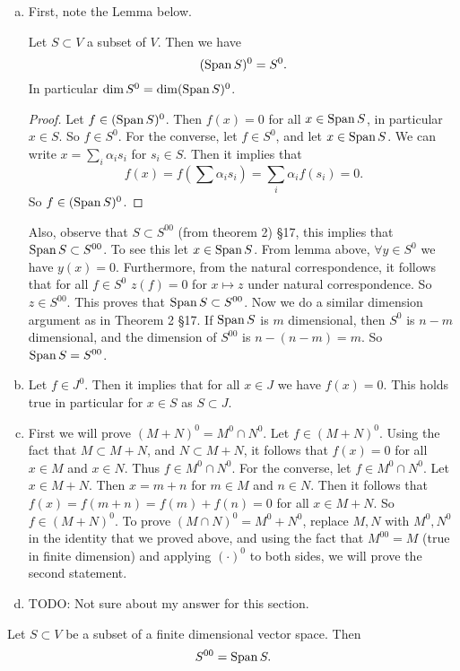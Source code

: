 \begin{problem}
	\begin{solution}
		\begin{enumerate}[(a)]
			\item First, note the Lemma below.
			\begin{lemma}
				Let $ S \subset V $ a subset of $ V $. Then we have
				\[ (\operatorname{Span} S)^0 = S^0. \]
				In particular $ \dim S^0  = \dim (\operatorname{Span} S)^0$.
			\end{lemma}
			\begin{proof}
				Let $ f\in (\operatorname{Span} S)^0 $. Then $ f(x) = 0 $ for all $ x\in \operatorname{Span} S $, in particular $ x\in S $. So $ f\in S^0 $. For the converse, let $ f \in S^0 $, and let $ x \in \operatorname{Span} S $. We can write $ x = \sum_i \alpha_i s_i $ for $ s_i \in S $. Then it implies that 
				\[ f(x) = f(\sum \alpha_i s_i) = \sum_i \alpha_i f(s_i) = 0.   \]
				So $ f\in (\operatorname{Span} S)^0 $.
			\end{proof}
			Also, observe that $ S \subset S^{00} $ (from theorem 2) \S17, this implies that $ \operatorname{Span} S \subset S^{00} $. To see this let $ x \in \operatorname{Span} S $. From lemma above, $ \forall y \in S^0 $ we have $ y(x) = 0 $. Furthermore, from the natural correspondence, it follows that for all $ f\in S^0 $ $ z(f) = 0 $ for $ x\mapsto z $ under natural correspondence. So $ z\in S^{00} $. This proves that $ \operatorname{Span} S \subset S^{00} $. Now we do a similar dimension argument as in Theorem 2 \S17. If $ \operatorname{Span} S $ is $ m $ dimensional, then $ S^0 $ is $ n-m $ dimensional, and the dimension of $ S^{00} $ is $ n-(n-m) = m $. So $ \operatorname{Span} S = S^{00} $.
			
			\item Let $ f \in  J^0$. Then it implies that for all $ x\in J $ we have $ f(x) = 0 $. This holds true in particular for $ x\in S $ as $ S\subset J $. 
			
			
			\item First we will prove $ (M+N)^0 = M^0 \cap N^0 $. Let $ f\in (M+N)^0 $. Using the fact that $ M\subset M+N $, and $ N\subset M+N $, it follows that $ f(x) = 0 $ for all $ x\in M $ and $ x\in N $. Thus $ f\in M^0\cap N^0 $. For the converse, let $ f\in M^0\cap N^0 $. Let $ x\in M+N $. Then $ x=m+n $ for $ m\in M $ and $ n\in N $. Then it follows that $ f(x) = f(m+n) = f(m) + f(n) = 0 $ for all $ x\in M+N $. So $ f\in (M+N)^0 $. To prove $ (M\cap N)^0 = M^0 + N^0 $, replace $ M,N $ with $ M^0,N^0 $ in the identity that we proved above, and using the fact that $ M^{00} = M $ (true in finite dimension) and applying $ (\cdot)^0 $ to both sides, we will prove the second statement.
			
			\item {\color{red} \noindent TODO: Not sure about my answer for this section.}
		\end{enumerate}
		
	
	\end{solution}

	\begin{theorem}
		Let $ S \subset V $ be a subset of a finite dimensional vector space. Then
		\[ S^{00} = \operatorname{Span} S. \]
	\end{theorem}
\end{problem}

